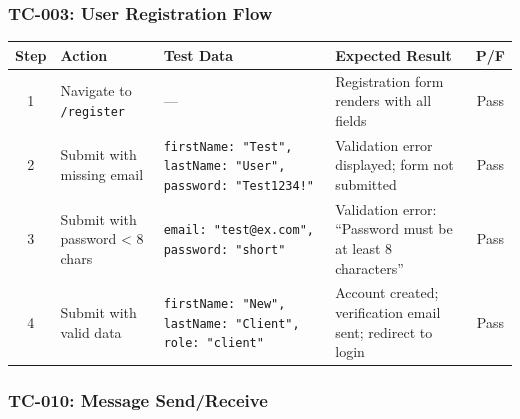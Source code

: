 \documentclass[12pt,letterpaper]{article}
\begin{document}
\subsubsection*{TC-003: User Registration Flow}

\begin{table}[!htbp]
\centering
\small
\begin{tabularx}{\textwidth}{|c|>{\raggedright\arraybackslash}X|>{\raggedright\arraybackslash}p{3cm}|>{\raggedright\arraybackslash}X|c|}
\hline
\rowcolor{TableHeader}\textcolor{TableHeaderText}{\textbf{Step}} & \textcolor{TableHeaderText}{\textbf{Action}} & \textcolor{TableHeaderText}{\textbf{Test Data}} & \textcolor{TableHeaderText}{\textbf{Expected Result}} & \textcolor{TableHeaderText}{\textbf{P/F}} \\
\hline
1 & Navigate to \texttt{/register} & --- & Registration form renders with all fields & Pass \\
\hline
\rowcolor{TableRowAlt}
2 & Submit with missing email & \texttt{firstName: "Test", lastName: "User", password: "Test1234!"} & Validation error displayed; form not submitted & Pass \\
\hline
3 & Submit with password < 8 chars & \texttt{email: "test@ex.com", password: "short"} & Validation error: ``Password must be at least 8 characters'' & Pass \\
\hline
\rowcolor{TableRowAlt}
4 & Submit with valid data & \texttt{firstName: "New", lastName: "Client", role: "client"} & Account created; verification email sent; redirect to login & Pass \\
\hline
\end{tabularx}
\end{table}

\subsubsection*{TC-010: Message Send/Receive}
\end{document}
